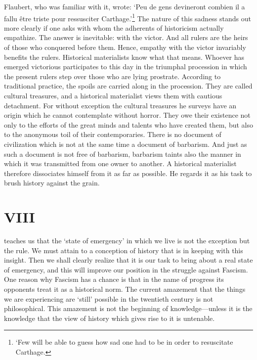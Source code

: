 \documentclass[12pt]{tufte-handout}
\begin{document}
Flaubert, who was familiar with it, wrote: `Peu de gens devineront combien il a fallu être triste pour ressusciter Carthage.'\footnote{`Few will be able to guess how sad one had to be in order to resuscitate Carthage.} The nature of this sadness stands out more clearly if one asks with whom the adherents of historicism actually empathize. The answer is inevitable: with the victor. 
And all rulers are the heirs of those who conquered before them. Hence, empathy with the victor invariably benefits the rulers. Historical materialists know what that means. Whoever has emerged victorious participates to this day in the triumphal procession in which the present rulers step over those who are lying prostrate. According to traditional practice, the spoils are carried along in the procession. They are called cultural treasures, and a historical materialist views them with cautious detachment. For without exception the cultural treasures he surveys have an origin which he cannot contemplate without horror. They owe their existence not only to the efforts of the great minds and talents who have created them, but also to the anonymous toil of their contemporaries. There is no document of civilization which is not at the same time a document of barbarism. And just as such a document is not free of barbarism, barbarism taints also the manner in which it was transmitted from one owner to another. A historical materialist therefore dissociates himself from it as far as possible. He regards it as his task to brush history against the grain. 	 
 	 	 
\section{VIII} 
 teaches us that the `state of emergency' in which we live is not the exception but the rule. We must attain to a conception of history that is in keeping with this insight. Then we shall clearly realize that it is our task to bring about a real state of emergency, and this will improve our position in the struggle against Fascism. One reason why Fascism has a chance is that in the name of progress its opponents treat it as a historical norm. The current amazement that the things we are experiencing are `still' possible in the twentieth century is not philosophical. This amazement is not the beginning of knowledge—unless it is the knowledge that the view of history which gives rise to it is untenable.	
\end{document}
